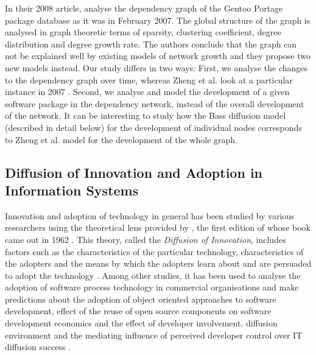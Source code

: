 \documentclass[smallextended,final]{svjour3}
\begin{document}
In their 2008 article, \citet{zheng08} analyse the dependency graph of the Gentoo Portage package database as it was in February 2007. The global structure of the graph is analysed in graph theoretic terms of sparsity, clustering coefficient, degree distribution and degree growth rate. The authors conclude that the graph can not be explained well by existing models of network growth and they propose two new models instead. Our study differs in two ways: First, we analyse the changes to the dependency graph over time, whereas Zheng et al. look at a particular instance in 2007 \citep{zheng08}. Second, we analyse and model the development of a given software package in the dependency network, instead of the overall development of the network. It can be interesting to study how the Bass diffusion model \citep{bass69} (described in detail below) for the development of individual nodes corresponds to Zheng et al. model for the development of the whole graph.



\subsection{Diffusion of Innovation and Adoption in Information Systems}\label{sect:DiffInn}

Innovation and adoption of technology in general has been studied by various researchers using the theoretical lens provided by \citet{rogers03}, the first edition of whose book came out in 1962 \citep{rogers62}. This theory, called the \emph{Diffusion of Innovation}, includes factors such as the characteristics of the particular technology, characteristics of the adopters and the means by which the adopters learn about and are persuaded to adopt the technology \citet{rogers03}. Among other studies, it has been used to analyse the adoption of software process technology in commercial organisations and make predictions about the adoption of object oriented approaches to software development\citep{fichman93}, effect of the reuse of open source components on software development economics \citep{ajila07} and the effect of developer involvement. diffusion environment and the mediating influence of perceived developer control over IT diffusion success \citet{green00}.
\end{document}
